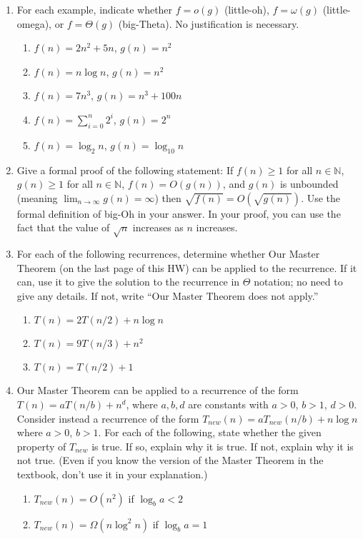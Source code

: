 \documentclass{article}
\begin{document}
\begin{enumerate}
    \item For each example, indicate whether $f = o(g)$ (little-oh), $f = \omega(g)$ (little-omega), or $f = \Theta(g)$ (big-Theta). No justification is necessary.
    \begin{enumerate}
        \item $f(n) = 2n^2 + 5n$, $g(n) = n^2$
        \item $f(n) = n \log n$, $g(n) = n^2$
        \item $f(n) = 7n^3$, $g(n) = n^3 + 100n$
        \item $f(n) = \sum_{i=0}^n 2^i$, $g(n) = 2^n$
        \item $f(n) = \log_2 n$, $g(n) = \log_{10} n$
    \end{enumerate}

    \item Give a formal proof of the following statement: If $f(n) \ge 1$ for all $n \in \mathbb{N}$, $g(n) \ge 1$ for all $n \in \mathbb{N}$, $f(n) = O(g(n))$, and $g(n)$ is unbounded (meaning $\lim_{n \to \infty} g(n) = \infty$) then $\sqrt{f(n)} = O(\sqrt{g(n)})$. Use the formal definition of big-Oh in your answer. In your proof, you can use the fact that the value of $\sqrt{n}$ increases as $n$ increases.

    \item For each of the following recurrences, determine whether Our Master Theorem (on the last page of this HW) can be applied to the recurrence. If it can, use it to give the solution to the recurrence in $\Theta$ notation; no need to give any details. If not, write “Our Master Theorem does not apply.”
    \begin{enumerate}
        \item $T(n) = 2T(n/2) + n \log n$
        \item $T(n) = 9T(n/3) + n^2$
        \item $T(n) = T(n/2) + 1$
    \end{enumerate}

    \item Our Master Theorem can be applied to a recurrence of the form $T(n) = aT(n/b) + n^d$, where $a, b, d$ are constants with $a > 0$, $b > 1$, $d > 0$. Consider instead a recurrence of the form $T_{new}(n) = aT_{new}(n/b) + n \log n$ where $a > 0$, $b > 1$. For each of the following, state whether the given property of $T_{new}$ is true. If so, explain why it is true. If not, explain why it is not true. (Even if you know the version of the Master Theorem in the textbook, don’t use it in your explanation.)
    \begin{enumerate}
        \item $T_{new}(n) = O(n^2)$ if $\log_b a < 2$
        \item $T_{new}(n) = \Omega(n \log^2 n)$ if $\log_b a = 1$
    \end{enumerate}


\end{enumerate}
\end{document}
